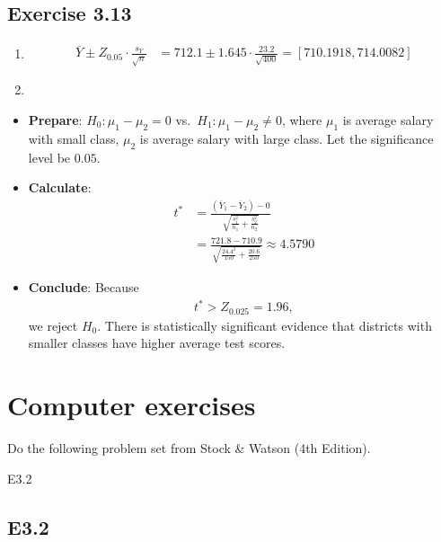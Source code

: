 \documentclass[
]{book}
\begin{document}
\hypertarget{exercise-3.13}{%
\section{Exercise 3.13}\label{exercise-3.13}}

\begin{enumerate}
\def\labelenumi{\alph{enumi}.}
\item
  \begin{align}
        \overline{Y} \pm Z_{0.05}\cdot \frac{s_Y}{\sqrt{n}}
        & = 712.1 \pm 1.645 \cdot \frac{23.2}{\sqrt{400}}
          = [710.1918, 714.0082]
    \end{align}
\item
\end{enumerate}

\begin{itemize}
\item
  \textbf{Prepare}:
  \(H_0: \mu_1 - \mu_2 = 0\) vs.~\(H_1: \mu_1 - \mu_2 \neq 0\), where \(\mu_1\) is average salary with small class, \(\mu_2\) is average salary with large class. Let the significance level be \(0.05\).
\item
  \textbf{Calculate}:
  \begin{align}
      t^*
      & = \frac{\left( \overline{Y}_1 - \overline{Y}_2 \right) - 0}{\sqrt{\frac{s_1^2}{n_1} + \frac{s_2^2}{n_2}}} \\
      & = \frac{721.8 - 710.9}{\sqrt{\frac{24.4^2}{150}+ \frac{20.6}{250}}} 
        \approx 4.5790
  \end{align}
\item
  \textbf{Conclude}:
  Because
  \begin{align}
      t^* > Z_{0.025} = 1.96,
  \end{align}
  we reject \(H_0\). There is statistically significant evidence that districts with smaller classes have higher average test scores.
\end{itemize}

\hypertarget{computer-exercises}{%
\chapter{Computer exercises}\label{computer-exercises}}

Do the following problem set from Stock \& Watson (4th Edition).

E3.2

\hypertarget{e3.2}{%
\section{E3.2}\label{e3.2}}
\end{document}

